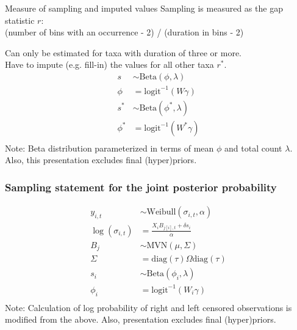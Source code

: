 \documentclass{beamer}
\begin{document}
\begin{frame}
  \begin{block}{Measure of sampling and imputed values}
    Sampling is measured as the gap statistic \(r\): \\(number of bins with an occurrence - 2) / (duration in bins - 2)

    Can only be estimated for taxa with duration of three or more. \\Have to impute (e.g. fill-in) the values for all other taxa \(r^{\ast}\).
    \begin{align*}
      s &\sim \text{Beta}(\phi, \lambda) \\
      \phi &= \text{logit}^{-1}(W\gamma) \\
      s^{\ast} &\sim \text{Beta}(\phi^{\ast}, \lambda) \\
      \phi^{\ast} &= \text{logit}^{-1}(W^{\ast}\gamma) \\
    \end{align*}
    \scriptsize{Note: Beta distribution parameterized in terms of mean \(\phi\) and total count \(\lambda\). \\Also, this presentation excludes final (hyper)priors.}
  \end{block}
\end{frame}

\begin{frame}
  \frametitle{Sampling statement for the joint posterior probability}

  \small{
    \begin{align*}
      y_{i, t} &\sim \text{Weibull}(\sigma_{i, t}, \alpha) \\
      \log(\sigma_{i, t}) &= \frac{X_{i}B_{j[i], t} + \delta s_{i}}{\alpha} \\
      B_{j} &\sim \text{MVN}(\mu, \Sigma) \\
      \Sigma &= \text{diag}(\tau) \Omega \text{diag}(\tau) \\
      s_{i} &\sim \text{Beta}(\phi_{i}, \lambda) \\
      \phi_{i} &= \text{logit}^{-1}(W_{i}\gamma) \\
    \end{align*}
  }
  \scriptsize{Note: Calculation of log probability of right and left censored observations is modified from the above. Also, presentation excludes final (hyper)priors.}
\end{frame}
\end{document}
